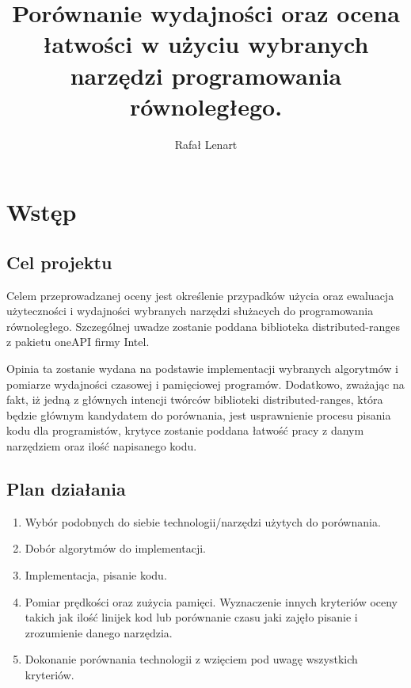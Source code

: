 \documentclass[11pt]{beamer}
\title{Porównanie wydajności oraz ocena łatwości w użyciu wybranych narzędzi programowania równoległego.}
\author{Rafał Lenart}
\begin{document}
\maketitle
\begin{frame}
	\tableofcontents
\end{frame}

\section{Wstęp}
\subsection{Cel projektu}
\begin{frame}{\subsecname}

	Celem przeprowadzanej oceny jest określenie przypadków użycia oraz ewaluacja 
	użyteczności  i wydajności wybranych narzędzi 
	służacych do programowania równoległego. Szczególnej uwadze zostanie poddana biblioteka distributed-ranges z pakietu oneAPI firmy Intel. 

	Opinia ta zostanie wydana na podstawie implementacji wybranych algorytmów i pomiarze 
	wydajności czasowej i pamięciowej programów. 
	Dodatkowo,	zważając na fakt, iż jedną z głównych intencji twórców biblioteki distributed-ranges, która będzie głównym kandydatem do porównania, jest 
	usprawnienie procesu pisania kodu dla programistów, krytyce zostanie poddana łatwość 
	pracy z danym narzędziem oraz ilość napisanego kodu.
	
\end{frame}

\subsection{Plan działania}
\begin{frame}{\subsecname}
	\begin{enumerate}
		\item Wybór podobnych do siebie technologii/narzędzi użytych do porównania.
		\item Dobór algorytmów do implementacji.
		\item Implementacja, pisanie kodu.
		\item Pomiar prędkości oraz zużycia pamięci. Wyznaczenie innych kryteriów oceny takich jak ilość linijek kod lub porównanie czasu jaki zajęło pisanie i zrozumienie danego narzędzia.
		\item Dokonanie porównania technologii z wzięciem pod uwagę wszystkich kryteriów. 
	\end{enumerate}	
\end{frame}
\end{document}
